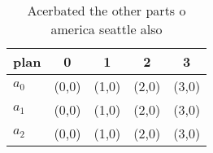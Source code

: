 \documentclass[a4paper]{article}
\begin{document}
\begin{table}
\begin{adjustbox}{width=0.6\columnwidth}
\begin{tabular}{|l|l|l|l|l|}
\hline
\textbf{plan} & \multicolumn{1}{c|}{\textbf{0}} & \multicolumn{1}{c|}{\textbf{1}} & \multicolumn{1}{c|}{\textbf{2}} & \multicolumn{1}{c|}{\textbf{3}} \\ \hline
\textbf{$a_0$}  & (0,0) & (1,0) & (2,0) & (3,0) \\ \hline
\textbf{$a_1$}  & (0,0) & (1,0) & (2,0) & (3,0) \\ \hline
\textbf{$a_2$}  & (0,0) & (1,0) & (2,0) & (3,0) \\ \hline
\end{tabular}
\end{adjustbox}
\caption{Acerbated the other parts o america seattle also 
}
\end{table}
\end{document}
